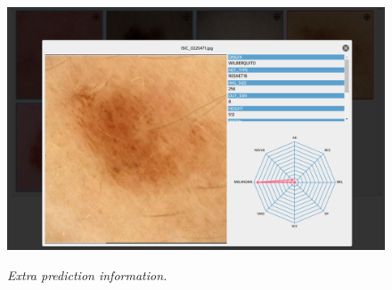 \newpage

\begin{figure}[H]
  \centering
  \begin{adjustbox}{width=\textwidth, trim={0.05cm 0cm 0.25cm 0cm}, clip}
    \includegraphics[]{imatges/results/extra-inf-popup.png}
  \end{adjustbox}
  \caption[Extra prediction information]{\textit{Extra prediction information.}}
  {\label{fig:extra-inf-popup}}
\end{figure}

\newpage
